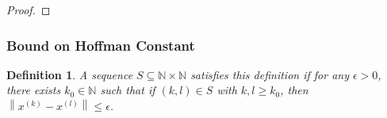 \documentclass{article}
\newtheorem{definition}[theorem]{Definition}
\theoremstyle{case}
\numberwithin{theorem}{subsection}
\DeclareMathOperator*{\argmin}{arg\,min}
\newcommand{\naturals}{\mathbb N}
\newcommand{\Rn}{\mathbb R^n}
\newcommand{\xk}{x^{(k)}}
\newcommand{\xl}{{x^{(l)}}}
\begin{document}
\begin{proof}
% 




% 
% 
% 
% 

\end{proof}


\subsubsection{Bound on Hoffman Constant}

\begin{definition}
\label{criteria_from_contradiction}
A sequence $S \subseteq\naturals \times \naturals$ satisfies this definition if
for any $\epsilon > 0$, there exists $k_0 \in \naturals$ such that if $(k, l) \in S$ with $k, l \ge k_0$, 
then 
$\left\|\xk - \xl \right\| \le \epsilon$.
\end{definition}
\end{document}

